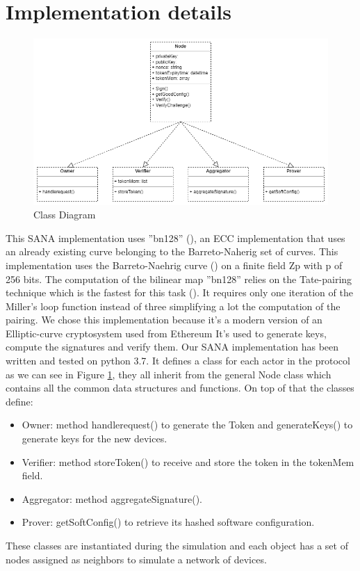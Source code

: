 \section{Implementation details}
\begin{figure}
    \centering
    \includegraphics[width=.90\linewidth]{Images/diagramma_classi.png}  
    \caption{Class Diagram}
    \label{fig:class_diagram}
  \end{figure}

This SANA implementation uses ''bn128'' (\cite{bn128_implementation}), an ECC implementation that uses an already existing curve belonging to the Barreto-Naherig set of curves.
This implementation uses the Barreto-Naehrig curve (\cite{barreto_naehrig}) on a finite field Zp with p of 256 bits.
The computation of the bilinear map ''bn128'' relies on the Tate-pairing technique which is the fastest for this task (\cite{tate_pairing}). It requires only one iteration of the Miller's loop function instead of three simplifying a lot the computation of the pairing.
We chose this implementation because it's a modern version of an Elliptic-curve cryptosystem used from Ethereum
It's used to generate keys, compute the signatures and verify them.
Our SANA implementation has been written and tested on python 3.7.
It defines a class for each actor in the protocol as we can see in Figure \ref{fig:class_diagram}, they all inherit from the general Node class which contains all the common data structures and functions.
On top of that the classes define:
\begin{itemize}
    \item Owner: method handlerequest() to generate the Token and generateKeys() to generate keys for the new devices.
    \item Verifier: method storeToken() to receive and store the token in the tokenMem field.
    \item Aggregator: method aggregateSignature().
    \item Prover: getSoftConfig() to retrieve its hashed software configuration.
\end{itemize}

These classes are instantiated during the simulation and each object has a set of nodes assigned as neighbors to simulate a network of devices.